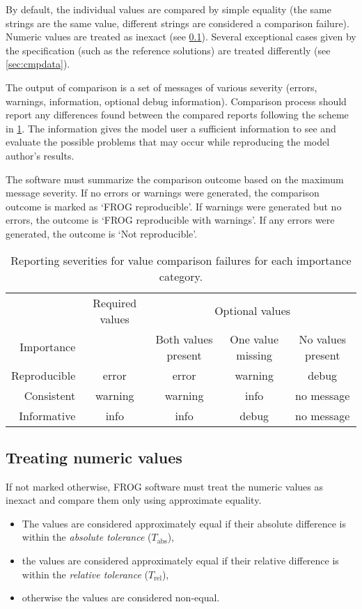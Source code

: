 By default, the individual values are compared by simple equality (the same strings are the same value, different strings are considered a comparison failure). Numeric values are treated as inexact (see \cref{sec:inexact}). Several exceptional cases given by the specification (such as the reference solutions) are treated differently (see \cref{sec:cmpdata}).

The output of comparison is a set of messages of various severity (errors, warnings, information, optional debug information). Comparison process should report any differences found between the compared reports following the scheme in \cref{tab:importance}. The information gives the model user a sufficient information to see and evaluate the possible problems that may occur while reproducing the model author's results.

The software must summarize the comparison outcome based on the maximum message severity. If no errors or warnings were generated, the comparison outcome is marked as `FROG reproducible'. If warnings were generated but no errors, the outcome is `FROG reproducible with warnings'. If any errors were generated, the outcome is `Not reproducible'.

\begin{table}\tablefont
\begin{tabular}{rcccc}
\toprule
 & Required values & \multicolumn{3}{c}{Optional values} \\ \cmidrule(rl){3-5}
Importance & & Both values present & One value missing & No values present \\
\midrule
Reproducible & error & error & warning & debug \\
Consistent & warning & warning & info & no message \\
Informative & info & info & debug & no message \\
\bottomrule
\end{tabular}
\caption[Comparison failure reporting levels]{Reporting severities for value comparison failures for each importance category.}
\label{tab:importance}
\end{table}

\subsection{Treating numeric values}
\label{sec:inexact}

If not marked otherwise, FROG software must treat the numeric values as inexact and compare them only using approximate equality.
\begin{itemize}
\item The values are considered approximately equal if their absolute difference is within the \emph{absolute tolerance} ($T_\text{abs}$),
\item the values are considered approximately equal if their relative difference is within the \emph{relative tolerance} ($T_\text{rel}$),
\item otherwise the values are considered non-equal.
\end{itemize}

